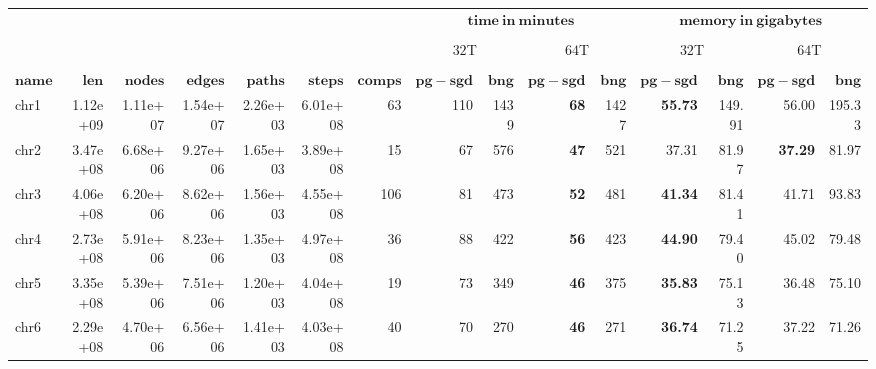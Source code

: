 \begin{table*}[!ht]
	\centering
	\caption{\label{tab:layout} }
	\begin{tabular}{@{}lrrrrrrrrrrrrrr@{}}
		& & & & & & &  \multicolumn{4}{c}{$\mathbf{time\ in\ minutes}$}  & \multicolumn{4}{c}{$\mathbf{memory\ in\ gigabytes}$}\\ 
	    \cmidrule(lr){8-11} \cmidrule(lr){12-15} \\
		& & & & & & & \multicolumn{2}{c}{$32$T} & \multicolumn{2}{c}{$64$T} & \multicolumn{2}{c}{$32$T} & \multicolumn{2}{c}{$64$T}\\
		\cmidrule(lr){8-9} \cmidrule(lr){10-11} \cmidrule(lr){12-13} \cmidrule(lr){14-15} \\
		{$\mathbf{name}$} & {$\mathbf{len}$} & {$\mathbf{nodes}$} & {$\mathbf{edges}$} & {$\mathbf{paths}$} & {$\mathbf{steps}$} & {$\mathbf{comps}$} & {$\mathbf{pg-sgd}$} & {$\mathbf{bng}$} & {$\mathbf{pg-sgd}$} & {$\mathbf{bng}$} & {$\mathbf{pg-sgd}$} & {$\mathbf{bng}$} & {$\mathbf{pg-sgd}$} & {$\mathbf{bng}$}\\ \hline
		chr1 & 1.12e+09 & 1.11e+07 & 1.54e+07 & 2.26e+03 & 6.01e+08 & 63 & 110 & 1439 &  \textbf{68} & 1427 & \textbf{55.73} & 149.91 & 56.00 & 195.33 \\ 
		chr2 & 3.47e+08 & 6.68e+06 & 9.27e+06 & 1.65e+03 & 3.89e+08 & 15 & 67 & 576 & \textbf{47} & 521 & 37.31 & 81.97 & \textbf{37.29} & 81.97 \\ 
		chr3 & 4.06e+08 & 6.20e+06 & 8.62e+06 & 1.56e+03 & 4.55e+08 & 106 & 81 & 473 & \textbf{52} & 481 & \textbf{41.34} & 81.41 & 41.71 & 93.83 \\ 
		chr4 & 2.73e+08 & 5.91e+06 & 8.23e+06 & 1.35e+03 & 4.97e+08 & 36 & 88 & 422 & \textbf{56} & 423 & \textbf{44.90} & 79.40 & 45.02 & 79.48 \\ 
		chr5 & 3.35e+08 & 5.39e+06 & 7.51e+06 & 1.20e+03 & 4.04e+08 & 19 & 73 & 349 & \textbf{46} & 375 & \textbf{35.83} & 75.13 & 36.48 & 75.10 \\ 
		chr6 & 2.29e+08 & 4.70e+06 & 6.56e+06 & 1.41e+03 & 4.03e+08 & 40 & 70 & 270 & \textbf{46} & 271 & \textbf{36.74} & 71.25 & 37.22 & 71.26 \\ 

\end{tabular}
\end{table*}

